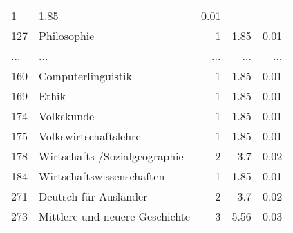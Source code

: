 \begin{longtable}{lXrrr}
          \num{1} &
          \num[round-mode=places,round-precision=2]{1,85} &
          \num[round-mode=places,round-precision=2]{0,01} \\
        127 & \multicolumn{1}{X}{Philosophie} & %
          \num{1} &
          \num[round-mode=places,round-precision=2]{1,85} &
          \num[round-mode=places,round-precision=2]{0,01} \\
       ... & ... & ... & ... & ... \\
        160 & \multicolumn{1}{X}{Computerlinguistik} & %
          \num{1} &
          \num[round-mode=places,round-precision=2]{1,85} &
          \num[round-mode=places,round-precision=2]{0,01} \\

        169 & \multicolumn{1}{X}{Ethik} & %
          \num{1} &
          \num[round-mode=places,round-precision=2]{1,85} &
          \num[round-mode=places,round-precision=2]{0,01} \\

        174 & \multicolumn{1}{X}{Volkskunde} & %
          \num{1} &
          \num[round-mode=places,round-precision=2]{1,85} &
          \num[round-mode=places,round-precision=2]{0,01} \\

        175 & \multicolumn{1}{X}{Volkswirtschaftslehre} & %
          \num{1} &
          \num[round-mode=places,round-precision=2]{1,85} &
          \num[round-mode=places,round-precision=2]{0,01} \\

        178 & \multicolumn{1}{X}{Wirtschafts-/Sozialgeographie} & %
          \num{2} &
          \num[round-mode=places,round-precision=2]{3,7} &
          \num[round-mode=places,round-precision=2]{0,02} \\

        184 & \multicolumn{1}{X}{Wirtschaftswissenschaften} & %
          \num{1} &
          \num[round-mode=places,round-precision=2]{1,85} &
          \num[round-mode=places,round-precision=2]{0,01} \\

        271 & \multicolumn{1}{X}{Deutsch für Ausländer} & %
          \num{2} &
          \num[round-mode=places,round-precision=2]{3,7} &
          \num[round-mode=places,round-precision=2]{0,02} \\

        273 & \multicolumn{1}{X}{Mittlere und neuere Geschichte} & %
          \num{3} &
          \num[round-mode=places,round-precision=2]{5,56} &
          \num[round-mode=places,round-precision=2]{0,03} \\


\end{longtable}

